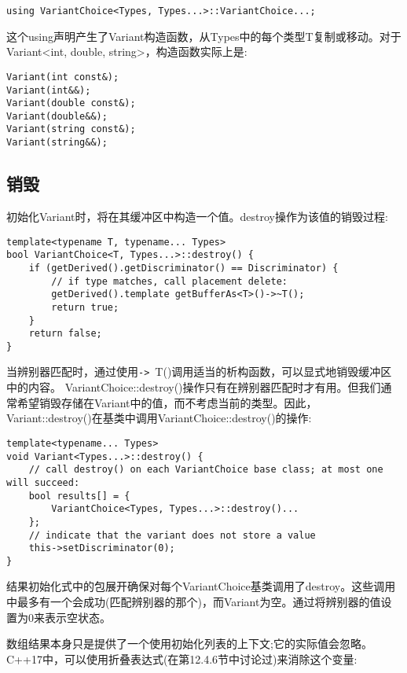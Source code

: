 \begin{lstlisting}[style=styleCXX]
using VariantChoice<Types, Types...>::VariantChoice...;
\end{lstlisting}

这个using声明产生了Variant构造函数，从Types中的每个类型T复制或移动。对于Variant<int, double, string>，构造函数实际上是:

\begin{lstlisting}[style=styleCXX]
Variant(int const&);
Variant(int&&);
Variant(double const&);
Variant(double&&);
Variant(string const&);
Variant(string&&);
\end{lstlisting}

\subsection{销毁}

初始化Variant时，将在其缓冲区中构造一个值。destroy操作为该值的销毁过程:

\begin{lstlisting}[style=styleCXX]
template<typename T, typename... Types>
bool VariantChoice<T, Types...>::destroy() {
	if (getDerived().getDiscriminator() == Discriminator) {
		// if type matches, call placement delete:
		getDerived().template getBufferAs<T>()->~T();
		return true;
	}
	return false;
}
\end{lstlisting}

当辨别器匹配时，通过使用\texttt{->}~T()调用适当的析构函数，可以显式地销毁缓冲区中的内容。 
VariantChoice::destroy()操作只有在辨别器匹配时才有用。但我们通常希望销毁存储在Variant中的值，而不考虑当前的类型。因此，Variant::destroy()在基类中调用VariantChoice::destroy()的操作:

\begin{lstlisting}[style=styleCXX]
template<typename... Types>
void Variant<Types...>::destroy() {
	// call destroy() on each VariantChoice base class; at most one will succeed:
	bool results[] = {
		VariantChoice<Types, Types...>::destroy()...
	};
	// indicate that the variant does not store a value
	this->setDiscriminator(0);
}
\end{lstlisting}

结果初始化式中的包展开确保对每个VariantChoice基类调用了destroy。这些调用中最多有一个会成功(匹配辨别器的那个)，而Variant为空。通过将辨别器的值设置为0来表示空状态。

数组结果本身只是提供了一个使用初始化列表的上下文;它的实际值会忽略。C++17中，可以使用折叠表达式(在第12.4.6节中讨论过)来消除这个变量:

